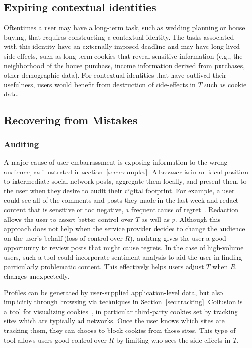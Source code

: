 \documentclass{llncs}
\begin{document}
\subsection{Expiring contextual identities}
Oftentimes a user may have a long-term task, such as wedding planning or house
buying, that requires constructing a contextual identity. The tasks associated
with this identity have an externally imposed deadline and may have long-lived
side-effects, such as long-term cookies that reveal sensitive information
(e.g., the neighborhood of the house purchase, income information derived from
purchases, other demographic data). For contextual identities that have
outlived their usefulness, users would benefit from destruction of side-effects
in $T$ such as cookie data.

\subsection{Recovering from Mistakes}
\subsubsection{Auditing}
A major cause of user embarrassment is exposing information to the wrong
audience, as illustrated in section~\ref{sec:examples}. A browser is in an
ideal position to intermediate social network posts, aggregate them locally,
and present them to the user when they desire to audit their digital footprint.
For example, a user could see all of the comments and posts they made in the
last week and redact content that is sensitive or too negative, a frequent cause
of regret~\cite{wang}.  Redaction allows the user to assert
better control over $T$ as well as $p$. Although this approach does not help when the service
provider decides to change the audience on the user's behalf (loss of control
over $R$), auditing gives the user a good opportunity to review posts that
might cause regrets. In the case of high-volume users, such a tool could
incorporate sentiment analysis to aid the user in finding particularly
problematic content.  This effectively helps users adjust $T$ when $R$ changes
unexpectedly.

Profiles can be generated by user-supplied application-level data, but also
implicitly through browsing via techniques in Section~\ref{sec:tracking}. Collusion is a
tool for visualizing cookies~\cite{collusion}, in particular third-party
cookies set by tracking sites which are typically ad networks.  Once the user
knows which sites are tracking them, they can choose to block cookies from
those sites.  This type of tool allows users good control over $R$ by limiting
who sees the side-effects in $T$.
\end{document}
